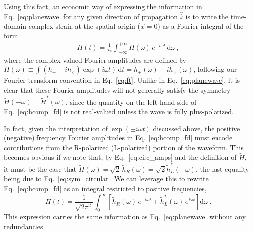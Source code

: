 \documentclass[aps,prd,twocolumn,superscriptaddress,preprintnumbers,floatfix,nofootinbib]{revtex4-2}
\newcommand{\infd}{\mathrm{d}}
\begin{document}
Using this fact, an economic way of expressing the information in Eq.~\eqref{eq:planewave} for any given direction of propagation $\hat{k}$ is to write the time-domain complex strain at the spatial origin ($\vec{x}=0$) as a Fourier integral of the form
\begin{align} \label{eq:hcomp_fd}
H(t) = \frac{1}{2\pi} \int_{-\infty}^{+\infty} \tilde{H}(\omega)\, e^{-i \omega t} \,\infd \omega \, ,
\end{align}
where the complex-valued Fourier amplitudes are defined by $\tilde{H}(\omega) \equiv \int (h_+ - i h_\times) \exp(i\omega t)\, \infd t = \tilde{h}_+(\omega) - i \tilde{h}_\times(\omega)$, following our Fourier transform convention in Eq.~\eqref{eq:ft}.
Unlike in Eq.~\eqref{eq:planewave}, it is clear that these Fourier amplitudes will not generally satisfy the symmetry $\tilde{H}(-\omega) = \tilde{H}^*(\omega)$, since the quantity on the left hand side of Eq.~\eqref{eq:hcomp_fd} is not real-valued unless the wave is fully plus-polarized.

In fact, given the interpretation of $\exp(\pm i \omega t)$ discussed above, the positive (negative) frequency Fourier amplitudes in Eq.~\eqref{eq:hcomp_fd} must encode contributions from the R-polarized (L-polarized) portion of the waveform.
This becomes obvious if we note that, by Eq.~\eqref{eq:circ_amps} and the definition of $\tilde{H}$, it must be the case that $\tilde{H}(\omega) = \sqrt{2}\, \tilde{h}_R (\omega) = \sqrt{2} \tilde{h}_L^*(-\omega)$, the last equality being due to Eq.~\eqref{eq:sym_circular}.
We can leverage this to rewrite Eq.~\eqref{eq:hcomp_fd} as an integral restricted to positive frequencies,
\begin{equation} \label{eq:hcomp_fd_rl}
H(t) = \frac{1}{\sqrt{2\pi^2}} \int_{0}^{\infty} \left[ \tilde{h}_R(\omega)\, e^{-i \omega t} + \tilde{h}_L^*(\omega)\, e^{i \omega t}\right] \infd \omega \, .
\end{equation}
This expression carries the same information as Eq.~\eqref{eq:planewave} without any redundancies.
\end{document}
